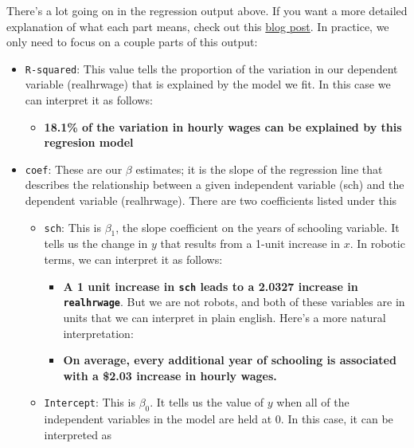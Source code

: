 \documentclass[
  letterpaper,
  DIV=11,
  numbers=noendperiod]{scrreprt}
\providecommand{\tightlist}{%
  \setlength{\itemsep}{0pt}\setlength{\parskip}{0pt}}\usepackage{longtable,booktabs,array}
\begin{document}
There's a lot going on in the regression output above. If you want a
more detailed explanation of what each part means, check out this
\href{https://medium.com/swlh/interpreting-linear-regression-through-statsmodels-summary-4796d359035a}{blog
post}. In practice, we only need to focus on a couple parts of this
output:

\begin{itemize}
\tightlist
\item
  \texttt{R-squared}: This value tells the proportion of the variation
  in our dependent variable (realhrwage) that is explained by the model
  we fit. In this case we can interpret it as follows:

  \begin{itemize}
  \tightlist
  \item
    \textbf{18.1\% of the variation in hourly wages can be explained by
    this regresion model}
  \end{itemize}
\item
  \texttt{coef}: These are our \(\beta\) estimates; it is the slope of
  the regression line that describes the relationship between a given
  independent variable (sch) and the dependent variable (realhrwage).
  There are two coefficients listed under this

  \begin{itemize}
  \tightlist
  \item
    \texttt{sch}: This is \(\beta_1\), the slope coefficient on the
    years of schooling variable. It tells us the change in \(y\) that
    results from a 1-unit increase in \(x\). In robotic terms, we can
    interpret it as follows:

    \begin{itemize}
    \tightlist
    \item
      \textbf{A 1 unit increase in \texttt{sch} leads to a 2.0327
      increase in \texttt{realhrwage}}. But we are not robots, and both
      of these variables are in units that we can interpret in plain
      english. Here's a more natural interpretation:
    \item
      \textbf{On average, every additional year of schooling is
      associated with a \$2.03 increase in hourly wages.}
    \end{itemize}
  \item
    \texttt{Intercept}: This is \(\beta_0\). It tells us the value of
    \(y\) when all of the independent variables in the model are held at
    0. In this case, it can be interpreted as


\end{itemize}
\end{itemize}
\end{document}
